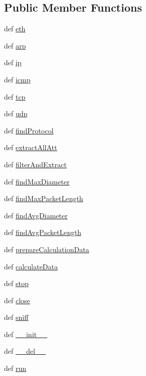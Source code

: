 \subsection*{Public Member Functions}
\begin{DoxyCompactItemize}
\item 
def \hyperlink{classsniffer-gui_1_1SniffThread_a6bac377ccd366abee365fb4925e0100c}{eth}
\item 
def \hyperlink{classsniffer-gui_1_1SniffThread_a6dad7abc00ccfecf5398c3df6d06b22b}{arp}
\item 
def \hyperlink{classsniffer-gui_1_1SniffThread_ad37b2c4be890b8bbec53e47b3904fc14}{ip}
\item 
def \hyperlink{classsniffer-gui_1_1SniffThread_a2f4b6474ac8e5bbf0ed3a5243f3277e4}{icmp}
\item 
def \hyperlink{classsniffer-gui_1_1SniffThread_af1c921c60dba1cfa9169c08b9f118a73}{tcp}
\item 
def \hyperlink{classsniffer-gui_1_1SniffThread_a0909f815e3c0d5d19d8324b4229b928c}{udp}
\item 
def \hyperlink{classsniffer-gui_1_1SniffThread_a38b3cc3c10314c6cfbc5a095fa071be4}{find\-Protocol}
\item 
def \hyperlink{classsniffer-gui_1_1SniffThread_a6a34d547fe9f264f06168bce287513ee}{extract\-All\-Att}
\item 
def \hyperlink{classsniffer-gui_1_1SniffThread_ab953c7fb3236a1b68a2db95e19394d0d}{filter\-And\-Extract}
\item 
def \hyperlink{classsniffer-gui_1_1SniffThread_ac02d295683d24d4b27b8686708a6c08c}{find\-Max\-Diameter}
\item 
def \hyperlink{classsniffer-gui_1_1SniffThread_aadae7ed35154631a921b2bb81c828964}{find\-Max\-Packet\-Length}
\item 
def \hyperlink{classsniffer-gui_1_1SniffThread_a3a34eb5f98a1206dc681290a3d1c53a5}{find\-Avg\-Diameter}
\item 
def \hyperlink{classsniffer-gui_1_1SniffThread_a298a4189098e9e51e40610d76a662f0a}{find\-Avg\-Packet\-Length}
\item 
def \hyperlink{classsniffer-gui_1_1SniffThread_ac11dc8c22cdc97fbb5e1b34e6eb244ec}{prepare\-Calculation\-Data}
\item 
def \hyperlink{classsniffer-gui_1_1SniffThread_a3896ce63a4578543dc8ac944154ed33b}{calculate\-Data}
\item 
def \hyperlink{classsniffer-gui_1_1SniffThread_ae0e09256ca1bab3e5198619c7be0d817}{stop}
\item 
def \hyperlink{classsniffer-gui_1_1SniffThread_a6eb91a58e9b29b3d522d34c3a5b5d750}{close}
\item 
def \hyperlink{classsniffer-gui_1_1SniffThread_a6d57f1e9fe47335fcd4e4ba2b44fd983}{sniff}
\item 
def \hyperlink{classsniffer-gui_1_1SniffThread_a292288fb4426e7dd3c472eae2633f9d2}{\-\_\-\-\_\-init\-\_\-\-\_\-}
\item 
def \hyperlink{classsniffer-gui_1_1SniffThread_ab030ccecdb9c515e9dc481a0b025c5e9}{\-\_\-\-\_\-del\-\_\-\-\_\-}
\item 
def \hyperlink{classsniffer-gui_1_1SniffThread_a6299b82d1da5a95db4ce5492f4bc3132}{run}
\end{DoxyCompactItemize}

